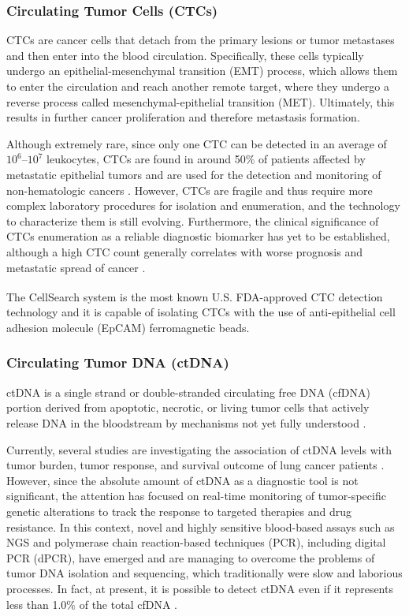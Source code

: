 \subsubsection{Circulating Tumor Cells (CTCs)}

CTCs are cancer cells that detach from the primary lesions or tumor metastases and then enter into the blood circulation. Specifically, these cells typically undergo an epithelial-mesenchymal transition (EMT) process, which allows them to enter the circulation and reach another remote target, where they undergo a reverse process called mesenchymal-epithelial transition (MET). Ultimately, this results in further cancer proliferation and therefore metastasis formation.

Although extremely rare, since only one CTC can be detected in an average of $10^6$–$10^7$ leukocytes, CTCs are found in around 50\% of patients affected by metastatic epithelial tumors and are used for the detection and monitoring of non-hematologic cancers \cite{CTC_prognosis, CTC_blood}. However, CTCs are fragile and thus require more complex laboratory procedures for isolation and enumeration, and the technology to characterize them is still evolving. Furthermore, the clinical significance of CTCs enumeration as a reliable diagnostic biomarker has yet to be established, although a high CTC count generally correlates with worse prognosis and metastatic spread of cancer \cite{CTC_prognosis}.

The CellSearch\textsuperscript\textregistered{} system is the most known U.S. FDA-approved CTC detection technology and it is capable of isolating CTCs with the use of anti-epithelial cell adhesion molecule (EpCAM) ferromagnetic beads.

\subsubsection{Circulating Tumor DNA (ctDNA)}

ctDNA is a single strand or double-stranded circulating free DNA (cfDNA) portion derived from apoptotic, necrotic, or living tumor cells that actively release DNA in the bloodstream by mechanisms not yet fully understood \cite{ctDNA}. 

Currently, several studies are investigating the association of ctDNA levels with tumor burden, tumor response, and survival outcome of lung cancer patients \cite{ctDNA, ctDNA_NSCLC}. However, since the absolute amount of ctDNA as a diagnostic tool is not significant, the attention has focused on real-time monitoring of tumor-specific genetic alterations to track the response to targeted therapies and drug resistance. In this context, novel and highly sensitive blood-based assays such as NGS and polymerase chain reaction-based techniques  (PCR), including digital PCR (dPCR), have emerged and are managing to overcome the problems of tumor DNA isolation and sequencing, which traditionally were slow and laborious processes. In fact, at present, it is possible to detect ctDNA even if it represents less than 1.0\% of the total cfDNA \cite{ctDNA_NSCLC, ctDNA_LB}.

